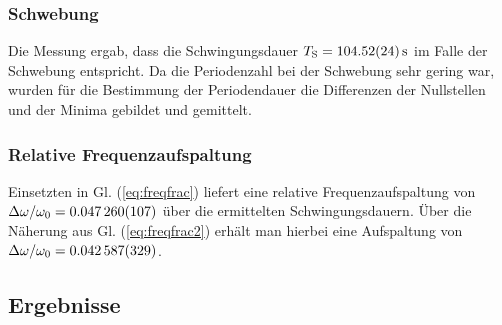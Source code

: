 \documentclass[11pt,a4paper,titlepage, ngerman]{article}
\newcommand{\refeq}[1]{Gl. (\ref{eq:#1})}
\begin{document}
			\subsubsection{Schwebung}
			
				Die Messung ergab, dass die Schwingungsdauer $T_\text{S} = \SI{104,52 +- 0,24}{\second}$ im Falle der Schwebung entspricht.  Da die Periodenzahl bei der Schwebung sehr gering war, wurden für die Bestimmung der Periodendauer die Differenzen der Nullstellen und der Minima gebildet und gemittelt.
			
			\subsubsection{Relative Frequenzaufspaltung}
			
				Einsetzten in \refeq{freqfrac} liefert eine relative Frequenzaufspaltung von $\Delta\omega / \omega_0 = \SI{0,047260 +- 0,000107}{}$ über die ermittelten Schwingungsdauern. Über die Näherung aus \refeq{freqfrac2} erhält man hierbei eine Aufspaltung von $\Delta\omega / \omega_0 = \SI{0,042587 +- 0,000329}{}$.
																
		\subsection{Ergebnisse}	
			
\end{document}
